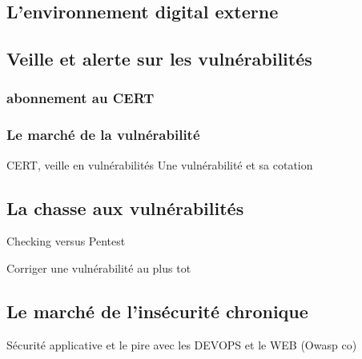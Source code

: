 \subsection{L’environnement digital externe}

\subsection{Veille et alerte sur les vulnérabilités}

\subsubsection{abonnement au CERT}


	\subsubsection{Le marché de la vulnérabilité}

	CERT,  veille en vulnérabilités
	Une vulnérabilité et sa cotation

\subsection{La chasse aux vulnérabilités}
	Checking versus Pentest


Corriger une vulnérabilité au plus tot
\subsection{Le marché de l’insécurité chronique}
	Sécurité applicative
	et le pire avec les DEVOPS et le WEB (Owasp co)


 


